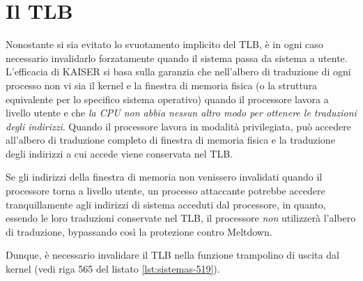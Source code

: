 \section{Il TLB}
Nonostante si sia evitato lo svuotamento implicito del TLB, è in ogni caso necessario invalidarlo forzatamente quando il sistema passa da sistema a utente. 
L'efficacia di KAISER si basa sulla garanzia che nell'albero di traduzione di ogni processo non vi sia il kernel e la finestra di memoria fisica (o la struttura equivalente per lo specifico sistema operativo) quando il processore lavora a livello utente e che \emph{la CPU non abbia nessun altro modo per ottenere le traduzioni degli indirizzi}.
Quando il processore lavora in modalità privilegiata, può accedere all'albero di traduzione completo di finestra di memoria fisica e la traduzione degli indirizzi a cui accede viene conservata nel TLB.

Se gli indirizzi della finestra di memoria non venissero invalidati quando il processore torna a livello utente, un processo attaccante potrebbe accedere tranquillamente agli indirizzi di sistema acceduti dal processore, in quanto, essendo le loro traduzioni conservate nel TLB, il processore \emph{non} utilizzerà l'albero di traduzione, bypassando così la protezione contro Meltdown.

Dunque, è necessario invalidare il TLB nella funzione trampolino di uscita dal kernel (vedi riga 565 del listato \vref{lst:sistemas-519}).